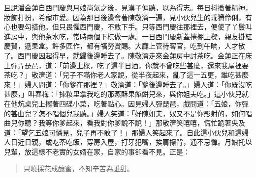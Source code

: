 且說潘金蓮自西門慶與月娘尚氣之後，見漢子偏聽，以為得志。每日抖擻著精神，妝飾打扮，希寵市愛。因為那日後邊會著陳敬濟一遍，見小伙兒生的乖猾伶俐，有心也要勾搭他。但只畏懼西門慶，不敢下手。只等西門慶往那裡去，便使了丫鬟叫進房中，與他茶水吃，常時兩個下棋做一處。一日西門慶新蓋捲棚上樑，親友掛紅慶賀，遞果盒。許多匠作，都有犒勞賞賜。大廳上管待客官，吃到午晌，人才散了。西門慶因起得早，就歸後邊睡去了。陳敬濟走來金蓮房中討茶吃。金蓮正在床上彈弄琵琶，道：「前邊上樑，吃了這半日酒，你就不曾吃些甚麼，還來我屋裡要茶吃？」敬濟道：「兒子不瞞你老人家說，從半夜起來，亂了這一五更，誰吃甚麼來！」婦人問道：「你爹在那裡？」敬濟道：「爹後邊睡去了。」婦人道：「你既沒吃甚麼，」叫春梅：「揀籹里拿我吃的那蒸酥果餡餅兒來，與你姐夫吃。」這小伙兒就在他炕桌兒上擺著四碟小菜，吃著點心。因見婦人彈琵琶，戲問道：「五娘，你彈的甚曲兒？怎不唱個兒我聽。」婦人笑道：「好陳姐夫，奴又不是你影射的，如何唱曲兒你聽？我等你爹起來，看我對你爹說不說！」那敬濟笑嘻嘻，慌忙跪著央及道：「望乞五娘可憐見，兒子再不敢了！」那婦人笑起來了。自此這小伙兒和這婦人日近日親，或吃茶吃飯，穿房入屋，打牙犯嘴，挨肩擦背，通不忌憚。月娘托以兒輩，放這樣不老實的女婿在家，自家的事卻看不見。正是：
\begin{quote}
只曉採花成釀蜜，不知辛苦為誰甜。
\end{quote}
